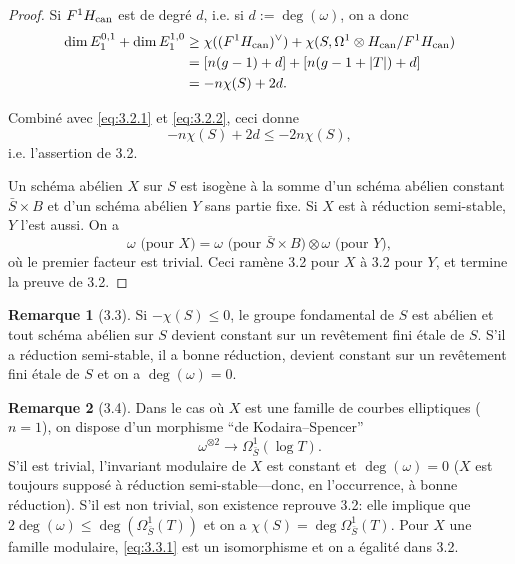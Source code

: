 \documentclass[12pt,a4paper]{article}
\theoremstyle{plain}
\theoremstyle{definition}
\newtheorem{remark}{Remarque}[section]
\newcommand{\can}{\textup{can}}
\begin{document}
\begin{proof}
Si $F^{1}H_{\can}$ est de degr\'{e} $d$, i.e. si $d := \deg(\omega)$, on a donc
\begin{align*}
\dim E_{1}^{0,1} + \dim E_{1}^{1,0} &\geq \chi((F^{1}H_{\can})^{\vee}) + \chi(S, \Omega^{1} \otimes H_{\can}/F^{1}H_{\can}) \\
&= [n(g-1) + d] + [n(g-1+|T|) + d] \\
&= -n\chi(S) + 2d.
\end{align*}

Combin\'{e} avec \eqref{eq:3.2.1} et \eqref{eq:3.2.2}, ceci donne
\[
-n\chi(S) + 2d \leq -2n\chi(S),
\]
i.e. l'assertion de 3.2.

Un sch\'{e}ma ab\'{e}lien $X$ sur $S$ est isog\`{e}ne \`{a} la somme d'un sch\'{e}ma ab\'{e}lien constant $\bar{S} \times B$ et d'un sch\'{e}ma ab\'{e}lien $Y$ sans partie fixe. Si $X$ est \`{a} r\'{e}duction semi-stable, $Y$ l'est aussi. On a
\[
\omega \text{ (pour } X) = \omega \text{ (pour } \bar{S} \times B) \otimes \omega \text{ (pour } Y),
\]
o\`{u} le premier facteur est trivial. Ceci ram\`{e}ne 3.2 pour $X$ \`{a} 3.2 pour $Y$, et termine la preuve de 3.2.
\end{proof}

\begin{remark}[3.3]
Si $-\chi(S) \leq 0$, le groupe fondamental de $S$ est ab\'{e}lien et tout sch\'{e}ma ab\'{e}lien sur $S$ devient constant sur un rev\^{e}tement fini \'{e}tale de $S$. S'il a r\'{e}duction semi-stable, il a bonne r\'{e}duction, devient constant sur un rev\^{e}tement fini \'{e}tale de $S$ et on a $\deg(\omega) = 0$.
\end{remark}

\begin{remark}[3.4]
Dans le cas o\`{u} $X$ est une famille de courbes elliptiques ($n=1$), on dispose d'un morphisme ``de Kodaira--Spencer''
\begin{equation}\label{eq:3.3.1}
\omega^{\otimes 2} \to \Omega^{1}_{\bar{S}}(\log T).
\end{equation}
S'il est trivial, l'invariant modulaire de $X$ est constant et $\deg(\omega) = 0$ ($X$ est toujours suppos\'{e} \`{a} r\'{e}duction semi-stable---donc, en l'occurrence, \`{a} bonne r\'{e}duction). S'il est non trivial, son existence reprouve 3.2: elle implique que $2\deg(\omega) \leq \deg(\Omega^{1}_{\bar{S}}(T))$ et on a $\chi(S) = \deg \Omega^{1}_{\bar{S}}(T)$. Pour $X$ une famille modulaire, \eqref{eq:3.3.1} est un isomorphisme et on a \'{e}galit\'{e} dans 3.2.
\end{remark}
\end{document}
